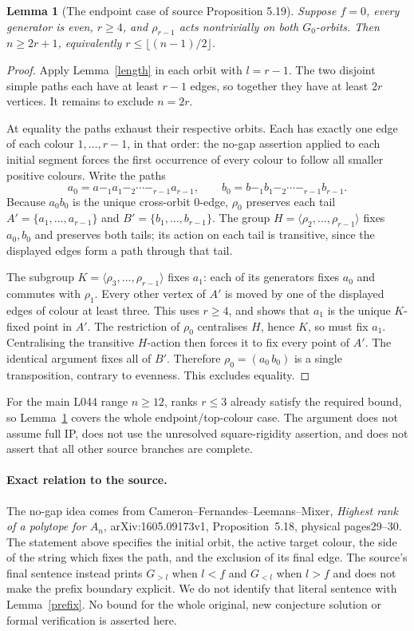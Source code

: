 \documentclass[11pt,a4paper]{article}
\newtheorem{lemma}{Lemma}
\newcommand{\gen}[1]{\langle#1\rangle}
\begin{document}
\begin{lemma}[The endpoint case of source Proposition 5.19]\label{endpoint}
Suppose $f=0$, every generator is even, $r\ge4$, and
$\rho_{r-1}$ acts nontrivially on both $G_0$-orbits. Then
$n\ge2r+1$, equivalently $r\le\lfloor(n-1)/2\rfloor$.
\end{lemma}
\begin{proof}
Apply Lemma~\ref{length} in each orbit with $l=r-1$. The two
disjoint simple paths each have at least $r-1$ edges, so together
they have at least $2r$ vertices. It remains to exclude $n=2r$.

At equality the paths exhaust their respective orbits. Each has
exactly one edge of each colour $1,\ldots,r-1$, in that order:
the no-gap assertion applied to each initial segment forces the
first occurrence of every colour to follow all smaller positive
colours. Write the paths
\[
 a_0=a\mathrel{-_1}a_1\mathrel{-_2}\cdots
 \mathrel{-_{r-1}}a_{r-1},\qquad
 b_0=b\mathrel{-_1}b_1\mathrel{-_2}\cdots
 \mathrel{-_{r-1}}b_{r-1}.
\]
Because $a_0b_0$ is the unique cross-orbit $0$-edge,
$\rho_0$ preserves each tail $A'=\{a_1,\ldots,a_{r-1}\}$ and
$B'=\{b_1,\ldots,b_{r-1}\}$. The group
$H=\gen{\rho_2,\ldots,\rho_{r-1}}$ fixes $a_0,b_0$ and
preserves both tails; its action on each tail is transitive,
since the displayed edges form a path through that tail.

The subgroup $K=\gen{\rho_3,\ldots,\rho_{r-1}}$ fixes $a_1$:
each of its generators fixes $a_0$ and commutes with $\rho_1$.
Every other vertex of $A'$ is moved by one of the displayed
edges of colour at least three. This uses $r\ge4$, and shows
that $a_1$ is the unique $K$-fixed point in $A'$. The restriction
of $\rho_0$ centralises $H$, hence $K$, so must fix $a_1$.
Centralising the transitive $H$-action then forces it to fix
every point of $A'$. The identical argument fixes all of $B'$.
Therefore $\rho_0=(a_0\,b_0)$ is a single transposition,
contrary to evenness. This excludes equality.
\end{proof}

For the main L044 range $n\ge12$, ranks $r\le3$ already satisfy
the required bound, so Lemma~\ref{endpoint} covers the whole
endpoint/top-colour case. The argument does not assume full IP,
does not use the unresolved square-rigidity assertion, and does
not assert that all other source branches are complete.

\paragraph{Exact relation to the source.}
The no-gap idea comes from Cameron--Fernandes--Leemans--Mixer,
\emph{Highest rank of a polytope for $A_n$},
arXiv:1605.09173v1, Proposition~5.18, physical pages29--30.
The statement above specifies the initial orbit, the active target
colour, the side of the string which fixes the path, and the
exclusion of its final edge. The source's final sentence instead
prints $G_{>l}$ when $l<f$ and $G_{<l}$ when $l>f$ and does not
make the prefix boundary explicit. We do not identify that literal
sentence with Lemma~\ref{prefix}. No bound for the whole original,
new conjecture solution or formal verification is asserted here.
\end{document}
